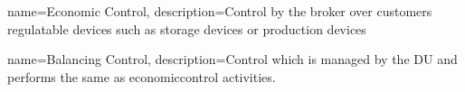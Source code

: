 \makeglossaries

{
	name=Economic Control,
	description={Control by the broker over customers regulatable devices such as storage devices or production devices}
}

{
	name=Balancing Control,
	description={Control which is managed by the \ac{DU} and performs the same as \gls{economiccontrol} activities.}
}


